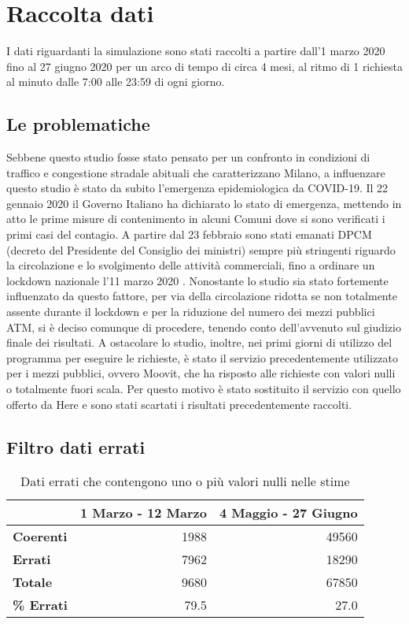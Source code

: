\section{Raccolta dati}

I dati riguardanti la simulazione sono stati raccolti a partire dall'1 marzo 2020 fino al 27 giugno 2020 per un arco di tempo di circa 4 mesi, al ritmo di 1 richiesta al minuto dalle 7:00 alle 23:59 di ogni giorno.

\subsection{Le problematiche}

Sebbene questo studio fosse stato pensato per un confronto in condizioni di traffico e congestione stradale abituali che caratterizzano Milano, a influenzare questo studio è stato da subito l'emergenza epidemiologica da COVID-19. Il 22 gennaio 2020 il Governo Italiano ha dichiarato lo stato di emergenza, mettendo in atto le prime misure di contenimento in alcuni Comuni dove si sono verificati i primi casi del contagio. A partire dal 23 febbraio sono stati emanati DPCM (decreto del Presidente del Consiglio dei ministri) sempre più stringenti riguardo la circolazione e lo svolgimento delle attività commerciali, fino a ordinare un lockdown nazionale l'11 marzo 2020 \cite{misuredelgovernopercovid}. Nonostante lo studio sia stato fortemente influenzato da questo fattore, per via della circolazione ridotta se non totalmente assente durante il lockdown e per la riduzione del numero dei mezzi pubblici ATM, si è deciso comunque di procedere, tenendo conto dell'avvenuto sul giudizio finale dei risultati. A ostacolare lo studio, inoltre, nei primi giorni di utilizzo del programma per eseguire le richieste, è stato il servizio precedentemente utilizzato per i mezzi pubblici, ovvero Moovit, che ha risposto alle richieste con valori nulli o totalmente fuori scala. Per questo motivo è stato sostituito il servizio con quello offerto da Here e sono stati scartati i risultati precedentemente raccolti.

\subsection{Filtro dati errati}

\begin{table}[H]
\centering
\begin{tabular}{ | l | r | r | }
\hline

& \textbf{1 Marzo - 12 Marzo} & \textbf{4 Maggio - 27 Giugno} \\
\hline

\textbf{Coerenti}& 1988 & 49560 \\  
\textbf{Errati} & 7962 & 18290 \\
\hline
\textbf{Totale} & 9680 & 67850 \\
\textbf{\% Errati} & 79.5 & 27.0 \\
\hline
\end{tabular}
\caption{Dati errati che contengono uno o più valori nulli nelle stime}
\label{table:1}
\end{table}

